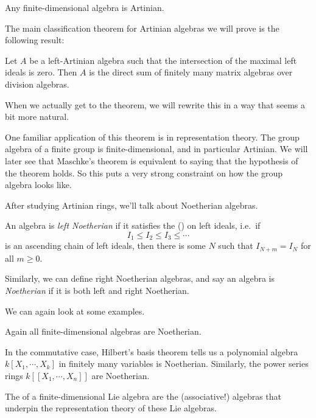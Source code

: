 \documentclass[a4paper]{article}
\begin{document}
\begin{eg}
  Any finite-dimensional algebra is Artinian.
\end{eg}

The main classification theorem for Artinian algebras we will prove is the following result:
\begin{thm}
  Let $A$ be a left-Artinian algebra such that the intersection of the maximal left ideals is zero. Then $A$ is the direct sum of finitely many matrix algebras over division algebras.
\end{thm}
When we actually get to the theorem, we will rewrite this in a way that seems a bit more natural.

One familiar application of this theorem is in representation theory. The group algebra of a finite group is finite-dimensional, and in particular Artinian. We will later see that Maschke's theorem is equivalent to saying that the hypothesis of the theorem holds. So this puts a very strong constraint on how the group algebra looks like.

After studying Artinian rings, we'll talk about Noetherian algebras.
\begin{defi}
  An algebra is \emph{left Noetherian} if it satisfies the  () on left ideals, i.e.\ if
  \[
    I_1 \leq I_2 \leq I_3 \leq \cdots
  \]
  is an ascending chain of left ideals, then there is some $N$ such that $I_{N + m} = I_N$ for all $m \geq 0$.

  Similarly, we can define right Noetherian algebras, and say an algebra is \emph{Noetherian} if it is both left and right Noetherian.
\end{defi}

We can again look at some examples.
\begin{eg}
  Again all finite-dimensional algebras are Noetherian.
\end{eg}

\begin{eg}
  In the commutative case, Hilbert's basis theorem tells us a polynomial algebra $k[X_1, \cdots, X_k]$ in finitely many variables is Noetherian. Similarly, the power series rings $k[[X_1, \cdots, X_n]]$ are Noetherian.
\end{eg}

\begin{eg}
  The  of a finite-dimensional Lie algebra are the (associative!) algebras that underpin the representation theory of these Lie algebras.
\end{eg}
\end{document}
